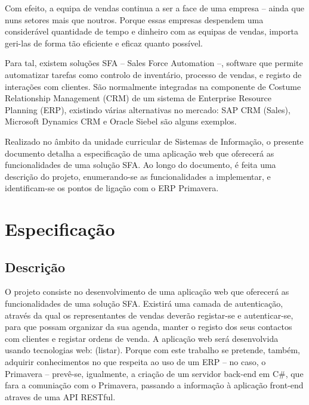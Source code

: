 \begin{titlepage}
Com efeito, a equipa de vendas continua a ser a face de uma empresa – ainda que nuns setores mais que noutros. Porque essas empresas despendem uma considerável quantidade de tempo e dinheiro com as equipas de vendas, importa geri-las de forma tão eficiente e eficaz quanto possível. 

Para tal, existem soluções SFA – Sales Force Automation –, software que permite automatizar tarefas como controlo de inventário, processo de vendas, e registo de interações com clientes. São normalmente integradas na componente de Costume Relationship Management (CRM) de um sistema de Enterprise Resource Planning (ERP), existindo várias alternativas no mercado: SAP CRM (Sales), Microsoft Dynamics CRM e Oracle Siebel são alguns exemplos. 

Realizado no âmbito da unidade curricular de Sistemas de Informação, o presente documento detalha a especificação de uma aplicação web que oferecerá as funcionalidades de uma solução SFA. Ao longo do documento, é feita uma descrição do projeto, enumerando-se as funcionalidades a implementar, e identificam-se os pontos de ligação com o ERP Primavera. 


\newpage %


\section{Especificação}

\subsection{Descrição}
\justify\normalsize

O projeto consiste no desenvolvimento de uma aplicação web que oferecerá as funcionalidades de uma solução SFA. Existirá uma camada de autenticação, através da qual os representantes de vendas deverão registar-se e autenticar-se, para que possam organizar da sua agenda, manter o registo dos seus contactos com clientes e registar ordens de venda. 
A aplicação web será desenvolvida usando tecnologias web: (listar). Porque com este trabalho se pretende, também, adquirir conhecimentos no que respeita ao uso de um ERP – no caso, o Primavera – prevê-se, igualmente, a criação de um servidor back-end em C\#, que fara a comuniação com o Primavera, passando a informação à aplicação front-end atraves de uma API RESTful. 


\end{titlepage}
